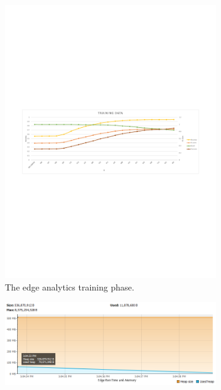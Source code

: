 \documentclass[letterpaper]{article}
\begin{document}
\begin{figure}
  \centering
  \begin{subfigure}[b]{0.475\textwidth}
      \centering
      \includegraphics[width=\textwidth]{figs/Edge_Training_Results.pdf}
      \caption[]%
      {The edge analytics training phase.}    
      \label{fig:Edge_Training_Results}
  \end{subfigure}
  \hfill
  \begin{subfigure}[b]{0.475\textwidth}  
      \centering 
      \includegraphics[width=\textwidth]{figs/Edgent_Run_Time_Memory.png}

\end{subfigure}
\end{figure}
\end{document}
